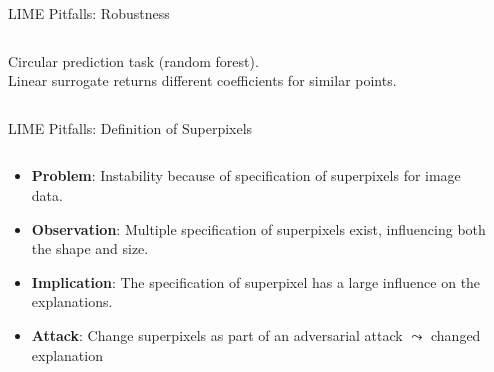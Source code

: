 \documentclass[11pt,compress,t,notes=noshow, aspectratio=169, xcolor=table]{beamer}
\begin{document}
\begin{vbframe}[c]{LIME Pitfalls: Robustness }
\begin{columns}
\begin{column}{0.48\textwidth}
\begin{center}
	{Circular prediction task (random forest). \\Linear surrogate returns different coefficients for similar points.}
	
	\end{center}
\end{column}
\end{columns}
\end{vbframe}

\begin{vbframe}{LIME Pitfalls: Definition of Superpixels}

\begin{columns}
    
    \begin{column}{0.6\textwidth}
        
        \begin{itemize}
        	\item \textbf{Problem}: Instability because of specification of superpixels for image data. 
        	\item \textbf{Observation}: Multiple specification of superpixels exist, influencing both the shape and size. 
        	\item \textbf{Implication}: The specification of superpixel has a large influence on the explanations. 
        	\item \textbf{Attack}: Change superpixels as part of an adversarial attack $\leadsto$ changed explanation
        \end{itemize}
        
    \end{column}
    
    \begin{column}{0.4\textwidth}
    

\end{column}
\end{columns}
\end{vbframe}
\end{document}
